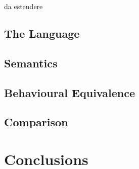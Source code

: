 \documentclass[10pt,a4paper, titlepage]{report}
\newcommand{\note}[1]{{\color{red} #1}}
\theoremstyle{remark}
\begin{document}
\note{da estendere}

\section{The Language}


\section{Semantics}





\section{Behavioural Equivalence}\label{bisimulation_chapter4}





\section{Comparison}




%
%

\chapter{Conclusions}
\printbibliography[
heading=bibintoc,
title={Bibliography}
]
\end{document}
